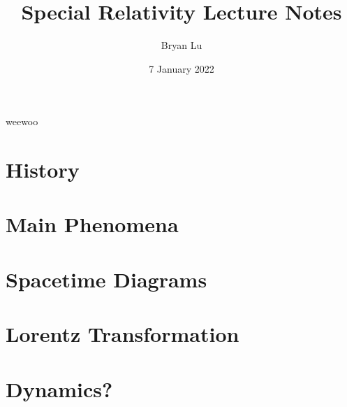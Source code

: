 \documentclass[12pt]{scrartcl}
\title{Special Relativity Lecture Notes}
\author{Bryan Lu}
\date{7 January 2022} %
\begin{document}
\maketitle

weewoo
\section{History}

\section{Main Phenomena}

\section{Spacetime Diagrams}

\section{Lorentz Transformation}

\section{Dynamics?}
\end{document}
